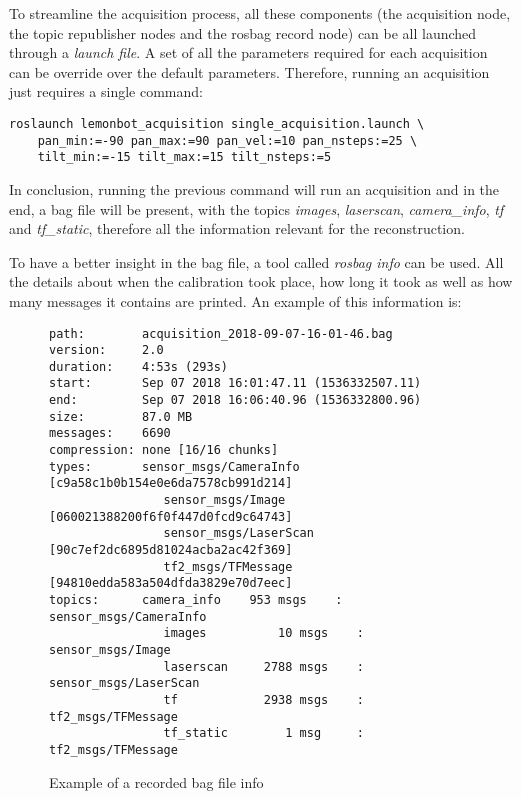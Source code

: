 To streamline the acquisition process, all these components (the acquisition node, the topic republisher nodes and the rosbag record node) can be all launched through a \emph{launch file}. A set of all the parameters required for each acquisition can be override over the default parameters. Therefore, running an acquisition just requires a single command:

\begin{verbatim}
roslaunch lemonbot_acquisition single_acquisition.launch \
    pan_min:=-90 pan_max:=90 pan_vel:=10 pan_nsteps:=25 \
    tilt_min:=-15 tilt_max:=15 tilt_nsteps:=5
\end{verbatim}

In conclusion, running the previous command will run an acquisition and in the end, a bag file will be present, with the topics \emph{images}, \emph{laserscan}, \emph{camera\_info}, \emph{tf} and \emph{tf\_static}, therefore all the information relevant for the reconstruction.

To have a better insight in the bag file, a tool called \emph{rosbag info} can be used. All the details about when the calibration took place, how long it took as well as how many messages it contains are printed. An example of this information is:

\begin{figure}
    
    \begin{Verbatim}[frame=single, fontsize=\small]
path:        acquisition_2018-09-07-16-01-46.bag
version:     2.0
duration:    4:53s (293s)
start:       Sep 07 2018 16:01:47.11 (1536332507.11)
end:         Sep 07 2018 16:06:40.96 (1536332800.96)
size:        87.0 MB
messages:    6690
compression: none [16/16 chunks]
types:       sensor_msgs/CameraInfo [c9a58c1b0b154e0e6da7578cb991d214]
                sensor_msgs/Image      [060021388200f6f0f447d0fcd9c64743]
                sensor_msgs/LaserScan  [90c7ef2dc6895d81024acba2ac42f369]
                tf2_msgs/TFMessage     [94810edda583a504dfda3829e70d7eec]
topics:      camera_info    953 msgs    : sensor_msgs/CameraInfo
                images          10 msgs    : sensor_msgs/Image     
                laserscan     2788 msgs    : sensor_msgs/LaserScan 
                tf            2938 msgs    : tf2_msgs/TFMessage    
                tf_static        1 msg     : tf2_msgs/TFMessage
    \end{Verbatim}

    \caption{Example of a recorded bag file info}
    \label{figure:bag-file-example}
\end{figure}

